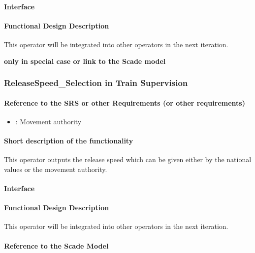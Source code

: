 \paragraph{Interface}

\paragraph{Functional Design Description}
This operator will be integrated into other operators in the next iteration.

\textbf{only in special case or link to the Scade model}

\subsubsection{ReleaseSpeed\_Selection in Train Supervision}

\paragraph{Reference to the SRS or other Requirements (or other requirements)}
\begin{itemize}
	\item \cite[Chapt.~3.8]{subset-026}: Movement authority 
\end{itemize}

\paragraph{Short description of the functionality}
This operator outputs the release speed which can be given either by the national values or the movement authority.

\paragraph{Interface}

\paragraph{Functional Design Description}
This operator will be integrated into other operators in the next iteration.

\paragraph{Reference to the Scade Model}


